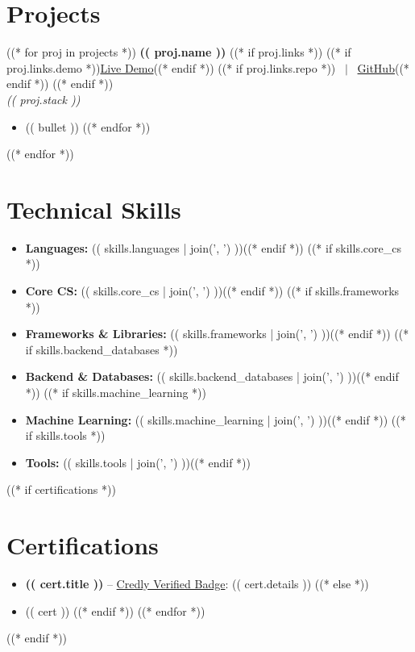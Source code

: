 \documentclass[10pt, a4paper]{article}
\begin{document}
\section{Projects}
((* for proj in projects *))
\noindent \textbf{(( proj.name ))} \hfill 
((* if proj.links *))
\small{
((* if proj.links.demo *))\href{(( proj.links.demo ))}{Live Demo}((* endif *))
((* if proj.links.repo *)) \ $|$ \ \href{(( proj.links.repo ))}{GitHub}((* endif *))
}
((* endif *)) \\
\textit{\small{(( proj.stack ))}}
\begin{itemize}
((* for bullet in proj.bullets *))
    \item (( bullet ))
((* endfor *))
\end{itemize}
\vspace{3pt}
((* endfor *))

\section{Technical Skills}
\begin{itemize}
    ((* if skills.languages *))\item \textbf{Languages:} (( skills.languages | join(', ') ))((* endif *))
    ((* if skills.core_cs *))\item \textbf{Core CS:} (( skills.core_cs | join(', ') ))((* endif *))
    ((* if skills.frameworks *))\item \textbf{Frameworks \& Libraries:} (( skills.frameworks | join(', ') ))((* endif *))
    ((* if skills.backend_databases *))\item \textbf{Backend \& Databases:} (( skills.backend_databases | join(', ') ))((* endif *))
    ((* if skills.machine_learning *))\item \textbf{Machine Learning:} (( skills.machine_learning | join(', ') ))((* endif *))
    ((* if skills.tools *))\item \textbf{Tools:} (( skills.tools | join(', ') ))((* endif *))
\end{itemize}

((* if certifications *))
\section{Certifications}
\begin{itemize}
((* for cert in certifications *))
((* if cert is mapping *))
    \item \textbf{(( cert.title ))} -- \href{(( cert.badge_url ))}{Credly Verified Badge}: (( cert.details ))
((* else *))
    \item (( cert ))
((* endif *))
((* endfor *))
\end{itemize}
((* endif *))
\end{document}
